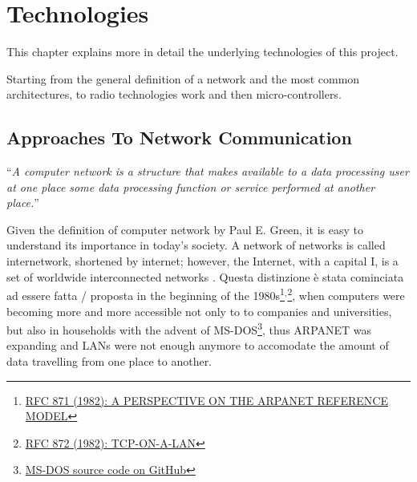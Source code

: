 
\chapter{Technologies}\label{chapter:technologies}


	
	This chapter explains more in detail the underlying technologies of this project.
	
	Starting from the general definition of a network and the most common architectures, to radio technologies work and then micro-controllers.
	

%	
	
	
\section{Approaches To Network Communication}
	
	\begin{center}
		\begin{minipage}[H]{0.9\columnwidth}
			\begin{center}
				``\textit{A computer network is a structure that makes available to a data processing user at one place some data processing function or service performed at another place.}''~\cite{nla.cat-vn252493}
			\end{center}
		\end{minipage}
	\end{center}
	
	Given the definition of computer network by Paul E. Green, it is easy to understand its importance in today's society.
	A network of networks is called internetwork, shortened by internet; however, the Internet, with a capital I, is a set of worldwide interconnected networks \cite{gg243376}.
	Questa distinzione è stata cominciata ad essere fatta / proposta in the beginning of the 1980s\footnote{\href{https://datatracker.ietf.org/doc/html/rfc871}{RFC 871 (1982): A PERSPECTIVE ON THE ARPANET REFERENCE MODEL}}$^{,}$\footnote{\href{https://datatracker.ietf.org/doc/html/rfc872}{RFC 872 (1982): TCP-ON-A-LAN}}, when computers were becoming more and more accessible not only to to companies and universities, but also in households with the advent of MS-DOS\footnote{\href{https://github.com/microsoft/MS-DOS}{MS-DOS source code on GitHub}}, thus ARPANET was expanding and LANs were not enough anymore to accomodate the amount of data travelling from one place to another.
	
